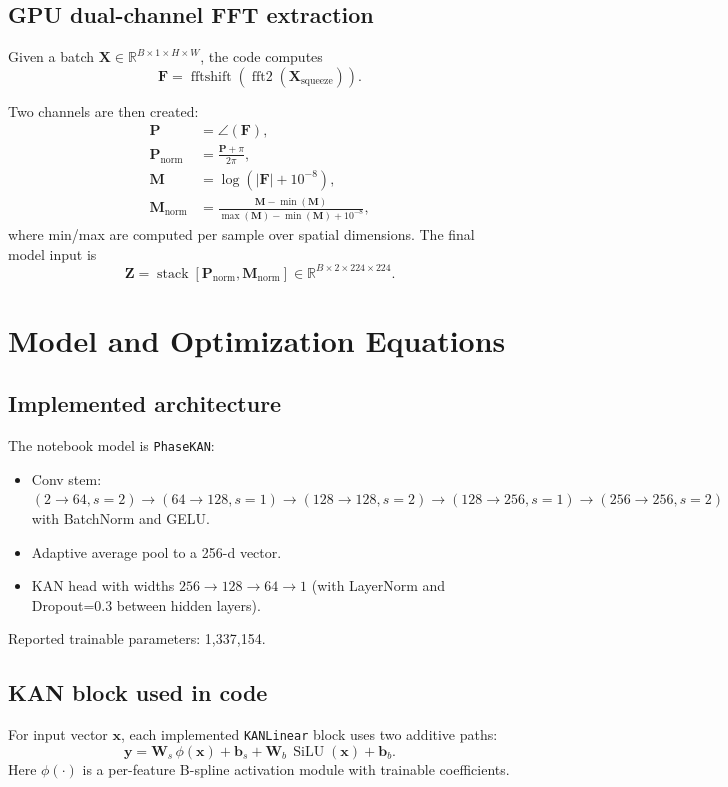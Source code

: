 \documentclass[conference]{IEEEtran}
\begin{document}
\subsection{GPU dual-channel FFT extraction}
Given a batch $\mathbf{X}\in\mathbb{R}^{B\times1\times H\times W}$, the code computes
\begin{equation}
\mathbf{F}=\operatorname{fftshift}(\operatorname{fft2}(\mathbf{X}_{\text{squeeze}})).
\end{equation}

Two channels are then created:
\begin{align}
\mathbf{P} &= \angle(\mathbf{F}), \\
\mathbf{P}_{\text{norm}} &= \frac{\mathbf{P}+\pi}{2\pi}, \\
\mathbf{M} &= \log\left(|\mathbf{F}| + 10^{-8}\right), \\
\mathbf{M}_{\text{norm}} &= \frac{\mathbf{M}-\min(\mathbf{M})}{\max(\mathbf{M})-\min(\mathbf{M})+10^{-8}},
\end{align}
where min/max are computed per sample over spatial dimensions.
The final model input is
\begin{equation}
\mathbf{Z}=\operatorname{stack}[\mathbf{P}_{\text{norm}},\mathbf{M}_{\text{norm}}]\in\mathbb{R}^{B\times2\times224\times224}.
\end{equation}

\section{Model and Optimization Equations}
\subsection{Implemented architecture}
The notebook model is \texttt{PhaseKAN}:
\begin{itemize}
    \item Conv stem: $(2\!\to\!64,s=2)\to(64\!\to\!128,s=1)\to(128\!\to\!128,s=2)\to(128\!\to\!256,s=1)\to(256\!\to\!256,s=2)$ with BatchNorm and GELU.
    \item Adaptive average pool to a 256-d vector.
    \item KAN head with widths $256\to128\to64\to1$ (with LayerNorm and Dropout=0.3 between hidden layers).
\end{itemize}
Reported trainable parameters: 1{,}337{,}154.

\subsection{KAN block used in code}
For input vector $\mathbf{x}$, each implemented \texttt{KANLinear} block uses two additive paths:
\begin{equation}
\mathbf{y}=\mathbf{W}_s\,\phi(\mathbf{x})+\mathbf{b}_s + \mathbf{W}_b\,\operatorname{SiLU}(\mathbf{x})+\mathbf{b}_b.
\end{equation}
Here $\phi(\cdot)$ is a per-feature B-spline activation module with trainable coefficients.
\end{document}
